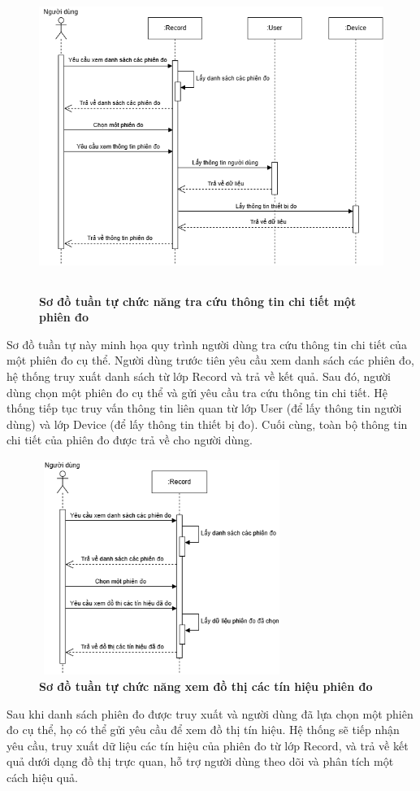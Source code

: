 \begin{figure}[H]
	\centering
	\includegraphics[width=12cm,height=10cm]{Images/sequence/record/getById.drawio.png}
	\caption[Sơ đồ tuần tự chức năng tra cứu thông tin chi tiết một phiên đo]{\bfseries \fontsize{12pt}{0pt}
		\selectfont Sơ đồ tuần tự chức năng tra cứu thông tin chi tiết một phiên đo}
	\label{sequence_get_record_by_id} %
\end{figure}
Sơ đồ tuần tự này minh họa quy trình người dùng tra cứu thông tin chi tiết của một phiên đo cụ thể. Người dùng trước tiên yêu cầu xem danh sách các phiên đo, hệ thống truy xuất danh sách từ lớp Record và trả về kết quả.
Sau đó, người dùng chọn một phiên đo cụ thể và gửi yêu cầu tra cứu thông tin chi tiết. Hệ thống tiếp tục truy vấn thông tin liên quan từ lớp User (để lấy thông tin người dùng) và lớp Device (để lấy thông tin thiết bị đo).
Cuối cùng, toàn bộ thông tin chi tiết của phiên đo được trả về cho người dùng.

\begin{figure}[H]
	\centering
	\includegraphics[width=8cm,height=7cm]{Images/sequence/record/chart.drawio.png}
	\caption[Sơ đồ tuần tự chức năng xem đồ thị các tín hiệu phiên đo]{\bfseries \fontsize{12pt}{0pt}
		\selectfont Sơ đồ tuần tự chức năng xem đồ thị các tín hiệu phiên đo}
	\label{sequence_chart} %
\end{figure}
Sau khi danh sách phiên đo được truy xuất và người dùng đã lựa chọn một phiên đo cụ thể, họ có thể gửi yêu cầu để xem đồ thị tín hiệu.
Hệ thống sẽ tiếp nhận yêu cầu, truy xuất dữ liệu các tín hiệu của phiên đo từ lớp Record, và trả về kết quả dưới dạng đồ thị trực quan, hỗ trợ người dùng theo dõi và phân tích một cách hiệu quả.

